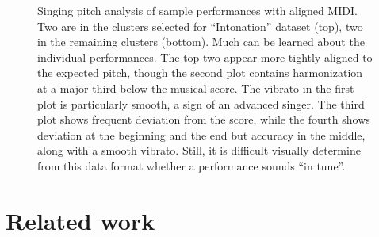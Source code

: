 \begin{figure}[h!]
    \vspace{-0.5in}
    \caption{Singing pitch analysis of sample performances with aligned MIDI. Two are in the clusters selected for  ``Intonation'' dataset (top), two in the remaining clusters (bottom). Much can be learned about the individual performances. The top two appear more tightly aligned to the expected pitch, though the second plot contains harmonization at a major third below the musical score. The vibrato in the first plot is particularly smooth, a sign of an advanced singer. The third plot shows frequent deviation from the score, while the fourth shows deviation at the beginning and the end but accuracy in the middle, along with a smooth vibrato. Still, it is difficult visually determine from this data format whether a performance sounds ``in tune''.}
    \label{fig:sample_intonation}
\end{figure}

\section{Related work}
\label{sec:related}

